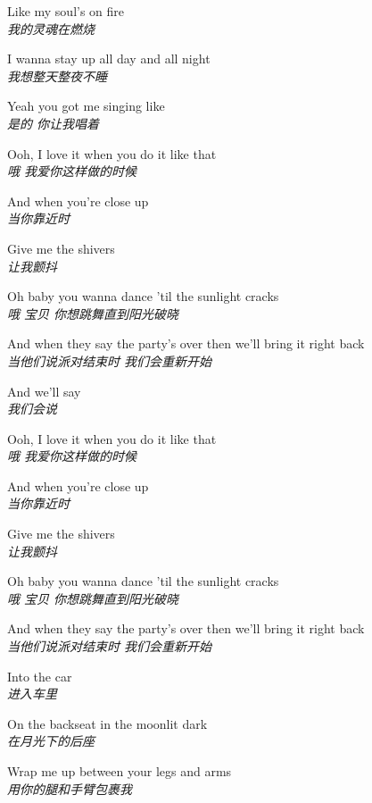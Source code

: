 \begin{spacing}{1.5}
\begin{flushleft}
Like my soul's on fire\\
\textit{我的灵魂在燃烧}\lyricspace

I wanna stay up all day and all night\\
\textit{我想整天整夜不睡}\lyricspace

Yeah you got me singing like\\
\textit{是的 你让我唱着}\lyricspace

Ooh, I love it when you do it like that\\
\textit{哦 我爱你这样做的时候}\lyricspace

And when you're close up\\
\textit{当你靠近时}\lyricspace

Give me the shivers\\
\textit{让我颤抖}\lyricspace

Oh baby you wanna dance 'til the sunlight cracks\\
\textit{哦 宝贝 你想跳舞直到阳光破晓}\lyricspace

And when they say the party's over then we'll bring it right back\\
\textit{当他们说派对结束时 我们会重新开始}\lyricspace

And we'll say\\
\textit{我们会说}\lyricspace

Ooh, I love it when you do it like that\\
\textit{哦 我爱你这样做的时候}\lyricspace

And when you're close up\\
\textit{当你靠近时}\lyricspace

Give me the shivers\\
\textit{让我颤抖}\lyricspace

Oh baby you wanna dance 'til the sunlight cracks\\
\textit{哦 宝贝 你想跳舞直到阳光破晓}\lyricspace

And when they say the party's over then we'll bring it right back\\
\textit{当他们说派对结束时 我们会重新开始}\lyricspace

Into the car\\
\textit{进入车里}\lyricspace

On the backseat in the moonlit dark\\
\textit{在月光下的后座}\lyricspace

Wrap me up between your legs and arms\\
\textit{用你的腿和手臂包裹我}\lyricspace


\end{flushleft}
\end{spacing}
